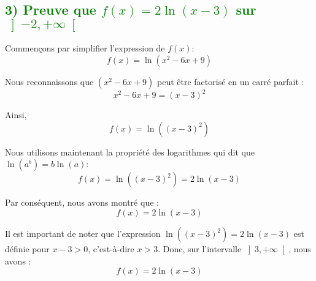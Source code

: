 \documentclass[12pt]{article}
\begin{document}
\begin{center}
\end{center}

\subsection*{\textcolor{green}{3) Preuve que \( f(x) = 2\ln(x-3) \) sur \( \left]-2, +\infty \right[ \)}}

Commençons par simplifier l'expression de \( f(x) \):
\[
f(x) = \ln(x^2 - 6x + 9)
\]

Nous reconnaissons que \( (x^2 - 6x + 9) \) peut être factorisé en un carré parfait :
\[
x^2 - 6x + 9 = (x - 3)^2
\]

Ainsi,
\[
f(x) = \ln((x - 3)^2)
\]

Nous utilisons maintenant la propriété des logarithmes qui dit que \( \ln(a^b) = b \ln(a) \):
\[
f(x) = \ln((x - 3)^2) = 2 \ln(x - 3)
\]

Par conséquent, nous avons montré que :
\[
f(x) = 2 \ln(x - 3)
\]

Il est important de noter que l'expression \( \ln((x - 3)^2) = 2 \ln(x - 3) \) est définie pour \( x - 3 > 0 \), c'est-à-dire \( x > 3 \). Donc, sur l'intervalle \( \left]3, +\infty \right[ \), nous avons :
\[
f(x) = 2 \ln(x - 3)
\]
\end{document}
